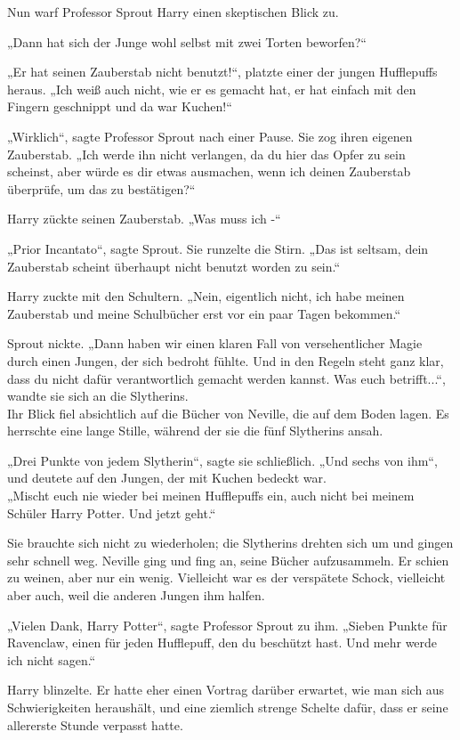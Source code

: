 {Nun warf Professor Sprout Harry einen skeptischen Blick zu.

„Dann hat sich der Junge wohl selbst mit zwei Torten beworfen?“

„Er hat seinen Zauberstab nicht benutzt!“, platzte einer der jungen Hufflepuffs heraus. „Ich weiß auch nicht, wie er es gemacht hat, er hat einfach mit den Fingern geschnippt und da war Kuchen!“

„Wirklich“, sagte Professor Sprout nach einer Pause. Sie zog ihren eigenen Zauberstab. „Ich werde ihn nicht verlangen, da du hier das Opfer zu sein scheinst, aber würde es dir etwas ausmachen, wenn ich deinen Zauberstab überprüfe, um das zu bestätigen?“

Harry zückte seinen Zauberstab. „Was muss ich -“

„Prior Incantato“, sagte Sprout. Sie runzelte die Stirn. „Das ist seltsam, dein Zauberstab scheint überhaupt nicht benutzt worden zu sein.“

Harry zuckte mit den Schultern. „Nein, eigentlich nicht, ich habe meinen Zauberstab und meine Schulbücher erst vor ein paar Tagen bekommen.“

Sprout nickte. „Dann haben wir einen klaren Fall von versehentlicher Magie durch einen Jungen, der sich bedroht fühlte. Und in den Regeln steht ganz klar, dass du nicht dafür verantwortlich gemacht werden kannst. Was euch betrifft...“, wandte sie sich an die Slytherins.\\ Ihr Blick fiel absichtlich auf die Bücher von Neville, die auf dem Boden lagen. Es herrschte eine lange Stille, während der sie die fünf Slytherins ansah.

„Drei Punkte von jedem Slytherin“, sagte sie schließlich. „Und sechs von ihm“, und deutete auf den Jungen, der mit Kuchen bedeckt war.\\ „Mischt euch nie wieder bei meinen Hufflepuffs ein, auch nicht bei meinem Schüler Harry Potter. Und jetzt geht.“

Sie brauchte sich nicht zu wiederholen; die Slytherins drehten sich um und gingen sehr schnell weg. Neville ging und fing an, seine Bücher aufzusammeln. Er schien zu weinen, aber nur ein wenig. Vielleicht war es der verspätete Schock, vielleicht aber auch, weil die anderen Jungen ihm halfen.

„Vielen Dank, Harry Potter“, sagte Professor Sprout zu ihm. „Sieben Punkte für Ravenclaw, einen für jeden Hufflepuff, den du beschützt hast. Und mehr werde ich nicht sagen.“

Harry blinzelte. Er hatte eher einen Vortrag darüber erwartet, wie man sich aus Schwierigkeiten heraushält, und eine ziemlich strenge Schelte dafür, dass er seine allererste Stunde verpasst hatte.

}
